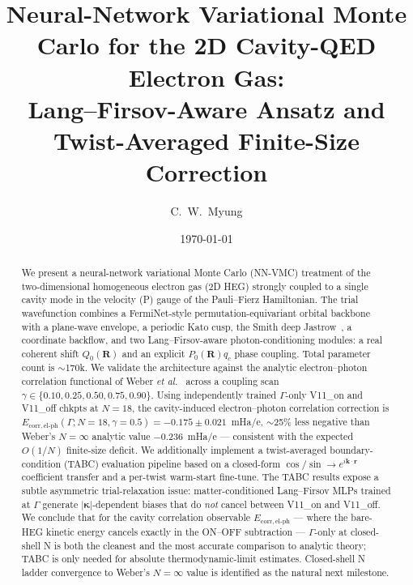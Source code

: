 \documentclass[reprint,amsmath,amssymb,aps,prb,floatfix,nofootinbib]{revtex4-2}
\newcommand{\todo}[1]{\textcolor{red}{[TODO: #1]}}
\newcommand{\Ehp}{E_{\mathrm{corr},\mathrm{el}\text{-}\mathrm{ph}}}
\begin{document}
\title{Neural-Network Variational Monte Carlo for the 2D
       Cavity-QED Electron Gas:\\
       Lang--Firsov-Aware Ansatz and Twist-Averaged Finite-Size
       Correction}

\author{C.~W.~Myung}
\affiliation{\todo{affiliations}}

\date{\today}

\begin{abstract}
We present a neural-network variational Monte Carlo (NN-VMC)
treatment of the two-dimensional homogeneous electron gas (2D HEG)
strongly coupled to a single cavity mode in the velocity (P) gauge of
the Pauli--Fierz Hamiltonian.  The trial wavefunction combines a
FermiNet-style permutation-equivariant orbital backbone with a plane-wave
envelope, a periodic Kato cusp, the Smith deep Jastrow~\cite{Smith2024},
a coordinate backflow, and two Lang--Firsov-aware photon-conditioning
modules: a real coherent shift $Q_0(\mathbf{R})$ and an explicit
$P_0(\mathbf{R}) q_c$ phase coupling.  Total parameter count is
$\sim$170k.  We validate the architecture against the analytic
electron--photon correlation functional of Weber \emph{et al.}~%
\cite{Weber2024} across a coupling scan
$\gamma \in \{0.10, 0.25, 0.50, 0.75, 0.90\}$.  Using independently
trained $\Gamma$-only V11\_on and V11\_off chkpts at $N=18$, the
cavity-induced electron--photon correlation correction is
$\Ehp(\Gamma; N{=}18, \gamma{=}0.5) = -0.175 \pm 0.021$~mHa/e,
$\sim$25\% less negative than Weber's $N{=}\infty$ analytic value
$-0.236$~mHa/e --- consistent with the expected $O(1/N)$ finite-size
deficit.  We additionally implement a twist-averaged boundary-condition
(TABC) evaluation pipeline based on a closed-form
$\cos/\sin \to e^{i \mathbf{k}\cdot\mathbf{r}}$ coefficient transfer
and a per-twist warm-start fine-tune.  The TABC results expose a
subtle asymmetric trial-relaxation issue: matter-conditioned
Lang--Firsov MLPs trained at $\Gamma$ generate $|\bm\kappa|$-dependent
biases that do \emph{not} cancel between V11\_on and V11\_off.  We
conclude that for the cavity correlation observable $\Ehp$ --- where
the bare-HEG kinetic energy cancels exactly in the ON--OFF
subtraction --- $\Gamma$-only at closed-shell N is both the cleanest
and the most accurate comparison to analytic theory; TABC is only
needed for absolute thermodynamic-limit estimates.  Closed-shell N
ladder convergence to Weber's $N{=}\infty$ value is identified as
the natural next milestone.
\end{abstract}
\end{document}

